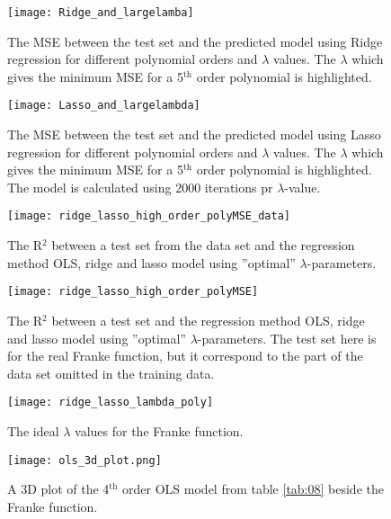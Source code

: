 \documentclass[uio,jmp,amsmath,amssymb,reprint,nofootinbib]{revtex4-1}
\numberwithin{equation}{section}
\begin{document}
\begin{figure}[H]
    \centering
    \texttt{[image: Ridge\_and\_largelamba]}
    \caption{The MSE between the test set and the predicted model using Ridge regression for different polynomial orders and \(\lambda\) values. The \(\lambda\) which gives the minimum MSE for a 5\(^\text{th}\) order polynomial is highlighted.}
    \label{fig:Vary_lambda_R2}
\end{figure}

\begin{figure}[H]
    \centering
    \texttt{[image: Lasso\_and\_largelambda]}
    \caption{The MSE between the test set and the predicted model using Lasso regression for different polynomial orders and \(\lambda\) values. The \(\lambda\) which gives the minimum MSE for a 5\(^\text{th}\) order polynomial is highlighted. The model is calculated using 2000 iterations pr \(\lambda\)-value.}
    \label{fig:Vary_lambda_L2}
\end{figure}

\begin{figure}[H]
    \centering
    \texttt{[image: ridge\_lasso\_high\_order\_polyMSE\_data]}
    \caption{The R\(^2\) between a test set from the data set and the regression method OLS, ridge and lasso model using ''optimal'' \(\lambda\)-parameters.}
    \label{fig:optimal_mse_franke}
\end{figure}

\begin{figure}[H]
    \centering
    \texttt{[image: ridge\_lasso\_high\_order\_polyMSE]}
    \caption{The R\(^2\) between a test set and the regression method OLS, ridge and lasso model using ''optimal'' \(\lambda\)-parameters. The test set here is for the real Franke function, but it correspond to the part of the data set omitted in the training data.}
    \label{fig:optimal_mse_data}
\end{figure}

\begin{figure}[H]
    \centering
    \texttt{[image: ridge\_lasso\_lambda\_poly]}
    \caption{The ideal \(\lambda\) values for the Franke function.}
    \label{fig:optimal_lambdas}
\end{figure}

\begin{figure}[H]
    \centering
    \texttt{[image: ols\_3d\_plot.png]}
    \caption{A 3D plot of the 4\(^\text{th}\) order OLS model from table \ref{tab:08} beside the Franke function.}
    \label{fig:ridge_3d}
\end{figure}
\end{document}
